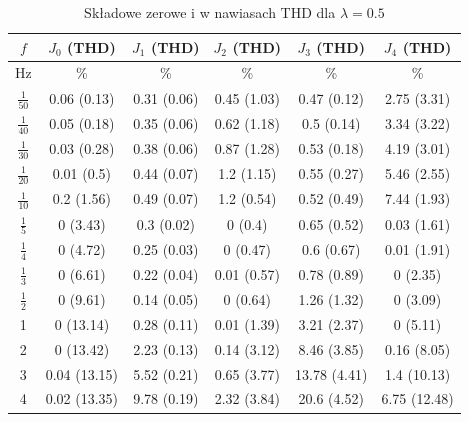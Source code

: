 \documentclass[journal,twoside,web]{ieeecolor}
\begin{document}
\begin{table}[h!]
	\centering
	\renewcommand{\arraystretch}{1.2}
	\caption{Składowe zerowe i w nawiasach THD dla $\lambda = 0.5$}
	\setlength{\tabcolsep}{6pt}
	\begin{tabular}{|c|c|c|c|c|c|}
		\hline
		$f$              & $J_0$ (THD)       & $J_1$ (THD)       & $J_2$ (THD)            & $J_3$ (THD)       & $J_4$ (THD)       \\ \hline
		Hz & \% & \% & \% & \% & \% \\ \hline
		\(\frac{1}{50}\) & 0.06 (0.13)      & 0.31 (0.06) & 0.45 (1.03) & 0.47 (0.12)       & 2.75 (3.31)      \\ \hline
		\(\frac{1}{40}\) & 0.05 (0.18)     & 0.35 (0.06) & 0.62 (1.18)  & 0.5 (0.14)       & 3.34 (3.22)      \\ \hline
		\(\frac{1}{30}\) & 0.03 (0.28)     & 0.38 (0.06) & 0.87 (1.28)  & 0.53 (0.18)      & 4.19 (3.01)      \\ \hline
		\(\frac{1}{20}\) & 0.01 (0.5)      & 0.44 (0.07) & 1.2 (1.15)   & 0.55 (0.27)      & 5.46 (2.55)      \\ \hline
		\(\frac{1}{10}\) & 0.2 (1.56)      & 0.49 (0.07) & 1.2 (0.54)   & 0.52 (0.49)      & 7.44 (1.93)      \\ \hline
		\(\frac{1}{5}\)  & 0 (3.43)        & 0.3 (0.02)  & 0 (0.4)      & 0.65 (0.52)      & 0.03 (1.61)      \\ \hline
		\(\frac{1}{4}\)  & 0 (4.72)        & 0.25 (0.03) & 0 (0.47)     & 0.6 (0.67)       & 0.01 (1.91)      \\ \hline
		\(\frac{1}{3}\)  & 0 (6.61)        & 0.22 (0.04) & 0.01 (0.57)  & 0.78 (0.89)      & 0 (2.35)         \\ \hline
		\(\frac{1}{2}\)  & 0 (9.61)        & 0.14 (0.05) & 0 (0.64)     & 1.26 (1.32)      & 0 (3.09)         \\ \hline
		1                & 0 (13.14)       & 0.28 (0.11) & 0.01 (1.39)  & 3.21 (2.37)      & 0 (5.11)         \\ \hline
		2                & 0 (13.42)       & 2.23 (0.13) & 0.14 (3.12)  & 8.46 (3.85)      & 0.16 (8.05)      \\ \hline
		3                & 0.04 (13.15)    & 5.52 (0.21) & 0.65 (3.77)  & 13.78 (4.41)     & 1.4 (10.13)      \\ \hline
		4                & 0.02 (13.35)    & 9.78 (0.19) & 2.32 (3.84)  & 20.6 (4.52)      & 6.75 (12.48)     \\ \hline
	\end{tabular}
	
	\label{tab:THDL05}
\end{table}
\end{document}
